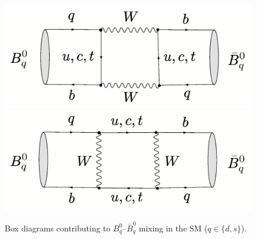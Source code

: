 \documentclass[12pt]{article}
\begin{document}
\begin{figure}
\centerline{
 \includegraphics[width=5.9truecm]{BqBqbar-box1.ps}
 \hspace*{0.5truecm}
 \includegraphics[width=5.9truecm]{BqBqbar-box2.ps}  
 }
 \vspace*{-0.4truecm}
 \caption{Box diagrams contributing to $B^0_q$--$\bar B^0_q$ mixing in the
 SM ($q\in\{d,s\}$).}
   \label{fig:boxes}
\end{figure}


%
%
%
\end{document}
